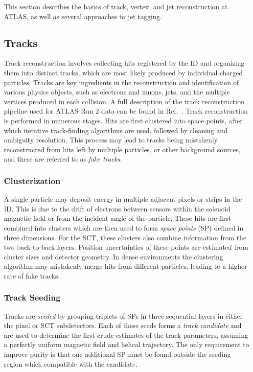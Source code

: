 This section describes the basics of track, vertex, and jet reconstruction at ATLAS, as well as several approaches to jet tagging.

\subsection{Tracks}

Track reconstruction involves collecting hits registered by the ID and organizing them into distinct tracks, which are most likely produced by individual charged particles.
Tracks are key ingredients in the reconstruction and identification of various physics objects, such as electrons and muons, jets, and the multiple vertices produced in each collision.
A full description of the track reconstruction pipeline used for ATLAS Run 2 data can be found in Ref.~\cite{PerformanceATLASTrack}.
Track reconstruction is performed in numerous stages.
Hits are first clustered into space points, after which iterative track-finding algorithms are used, followed by cleaning and ambiguity resolution.
This process may lead to tracks being mistakenly reconstructed from hits left by multiple particles, or other background sources, and these are referred to as \textit{fake tracks}.

\subsubsection{Clusterization}

A single particle may deposit energy in multiple adjacent pixels or strips in the ID\@.
This is due to the drift of electrons between sensors within the solenoid magnetic field or from the incident angle of the particle.
These hits are first combined into clusters which are then used to form \textit{space points} (SP) defined in three dimensions.
For the SCT, these clusters also combine information from the two back-to-back layers.
Position uncertainties of these points are estimated from cluster sizes and detector geometry.
In dense environments the clustering algorithm may mistakenly merge hits from different particles, leading to a higher rate of fake tracks.

\subsubsection{Track Seeding}

Tracks are \textit{seeded} by grouping triplets of SPs in three sequential layers in either the pixel or SCT subdetectors.
Each of these seeds forms a \textit{track candidate} and are used to determine the first crude estimates of the track parameters, assuming a perfectly uniform magnetic field and helical trajectory.
The only requirement to improve purity is that one additional SP must be found outside the seeding region which compatible with the candidate.

